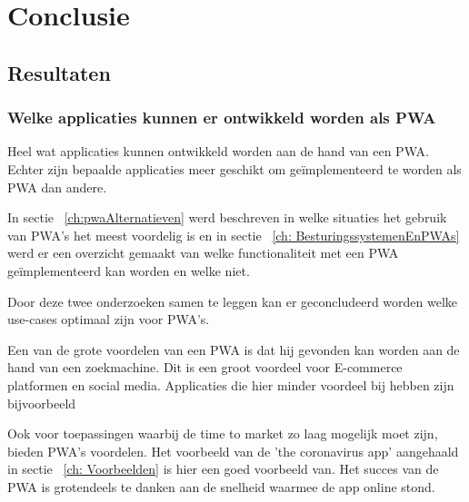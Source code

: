 
\chapter{Conclusie}
\label{ch:conclusie}

	  

\section{Resultaten}

	\subsection{Welke applicaties kunnen er ontwikkeld worden als PWA}
	
		Heel wat applicaties kunnen ontwikkeld worden aan de hand van een PWA. Echter zijn bepaalde applicaties meer geschikt om geïmplementeerd te worden als PWA dan andere.
		
		In sectie ~\ref{ch:pwaAlternatieven} werd beschreven in welke situaties het gebruik van PWA's het meest voordelig is en in sectie ~\ref{ch: BesturingssystemenEnPWAs} werd er een overzicht gemaakt van welke functionaliteit met een PWA geïmplementeerd kan worden en welke niet.
		
		Door deze twee onderzoeken samen te leggen kan er geconcludeerd worden welke use-cases optimaal zijn voor PWA's.
		
		Een van de grote voordelen van een PWA is dat hij gevonden kan worden aan de hand van een zoekmachine. Dit is een groot voordeel voor E-commerce platformen en social media.
		Applicaties die hier minder voordeel bij hebben zijn bijvoorbeeld 
		
		Ook voor toepassingen waarbij de time to market zo laag mogelijk moet zijn, bieden PWA's voordelen. Het voorbeeld van de 'the coronavirus app' aangehaald in sectie ~\ref{ch: Voorbeelden} is hier een goed voorbeeld van. Het succes van de PWA is grotendeels te danken aan de snelheid waarmee de app online stond.

